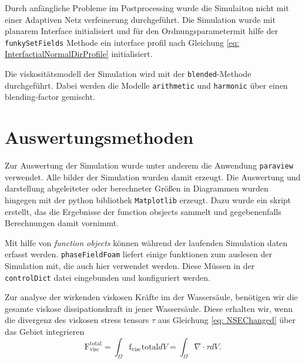 Durch anfängliche Probleme im Postprocessing wurde die Simulaiton nicht mit einer Adaptiven Netz verfeinerung durchgeführt. 
Die Simulation wurde mit planarem Interface initialisiert und für den Ordnungsparametermit hilfe der \texttt{funkySetFields} Methode ein interface profil nach Gleichung \ref{eq: InterfactialNormalDirProfile} initialisiert. 

Die viskositätsmodell der Simulation wird mit der \texttt{blended}-Methode durchgeführt. Dabei werden die Modelle \texttt{arithmetic} und \texttt{harmonic} über einen blending-factor gemischt. 

\section{Auswertungsmethoden}
Zur Auswertung der Simulation wurde unter anderem die Anwendung \texttt{paraview} verwendet. Alle bilder der Simulation wurden damit erzeugt. Die Auswertung und darstellung abgeleiteter oder berechneter Größen in Diagrammen wurden hingegen mit der python bibliothek \texttt{Matplotlib} erzeugt. Dazu wurde ein skript erstellt, das die Ergebnisse der function obsjects sammelt und gegebenenfalls Berechnungen damit vornimmt. 

Mit hilfe von \textit{function objects} können während der laufenden Simulation daten erfasst werden. \texttt{phaseFieldFoam} liefert einige funktionen zum auslesen der Simulation mit, die auch hier verwendet werden. Diese Müssen in der \texttt{controlDict} datei eingebunden und konfiguriert werden. 

Zur analyse der wirkenden viskosen Kräfte im der Wassersäule, benötigen wir die gesamte viskose dissipationskraft in jener Wassersäule. Diese erhalten wir, wenn die divergenz des viskosen stress tensors $\tau$ aus Gleichung \ref{eq: NSEChanged} über das Gebiet integrieren
\begin{equation}
    \mathrm{F}_{\mathrm{visc}}^{\mathrm{total}} = \int_{\Omega} \mathrm{f}_{\mathrm{visc}}{\mathrm{total}} dV = \int_{\Omega} \nabla \cdot \tau dV.
\end{equation}